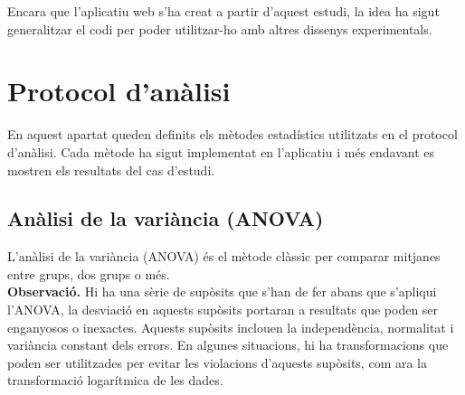 \documentclass[english]{article}
\begin{document}
Encara que l'aplicatiu web s'ha creat a partir d'aquest estudi, la idea ha sigut generalitzar el codi per poder utilitzar-ho amb altres dissenys experimentals.

\section{Protocol d'anàlisi}
En aquest apartat queden definits els mètodes estadístics utilitzats en el protocol d'anàlisi. Cada mètode ha sigut implementat en l'aplicatiu i més endavant es mostren els resultats del cas d'estudi.
\subsection{Anàlisi de la variància (ANOVA)}
L'anàlisi de la variància (ANOVA) és el mètode clàssic per comparar mitjanes entre grups, dos grups o més.
\\

\textbf{Observació.} Hi ha una sèrie de supòsits que s'han de fer abans que s'apliqui l'ANOVA, la desviació en aquests supòsits portaran a resultats que poden ser enganyosos o inexactes. Aquests supòsits inclouen la independència, normalitat i variància constant dels errors. En algunes situacions, hi ha transformacions que poden ser utilitzades per evitar les violacions d'aquests supòsits, com ara la transformació logarítmica de les dades.
\\
\end{document}
